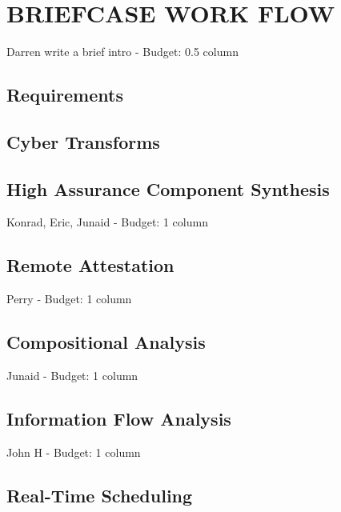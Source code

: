 \documentclass{IEEEcsmag}
\begin{document}
\section{BRIEFCASE WORK FLOW}
Darren write a brief intro -  Budget: 0.5 column
\cite{OSATE}



\subsection{Requirements}


\subsection{Cyber Transforms}


\subsection{High Assurance Component Synthesis}
Konrad, Eric, Junaid -  Budget: 1 column
\cite{case-verified-filter} \cite{hardin-co-assurance}
\cite{formal-filter-synth-langsec} \cite{contiguity-types} 

\subsection{Remote Attestation}
Perry -  Budget: 1 column


\subsection{Compositional Analysis}
Junaid -  Budget: 1 column


\subsection{Information Flow Analysis}
John H -  Budget: 1 column



\subsection{Real-Time Scheduling}

\end{document}
